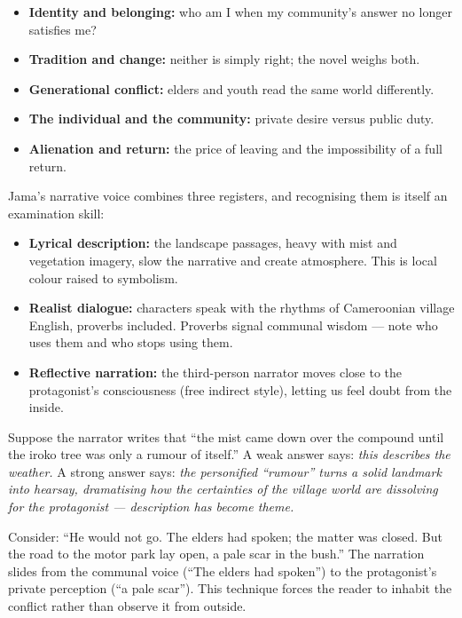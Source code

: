 \documentclass[11pt]{article}
\newcommand{\cle}[1]{{\popxbold\color{popdark}#1}}
\newcounter{popsec}
\newcounter{popsub}
\newcommand{\courssub}[1]{%
  \stepcounter{popsub}%
  \par\vspace{9pt}\noindent{\popxbold\fontsize{11.5}{13}\selectfont\color{popink}{\color{poporange}\thepopsec.\thepopsub}\hspace{6pt}#1}\par\nopagebreak\vspace{4pt}
}
\begin{document}
\begin{aretenir}
\begin{itemize}
\item \textbf{Identity and belonging:} who am I when my community's answer no longer satisfies me?
\item \textbf{Tradition and change:} neither is simply right; the novel weighs both.
\item \textbf{Generational conflict:} elders and youth read the same world differently.
\item \textbf{The individual and the community:} private desire versus public duty.
\item \textbf{Alienation and return:} the price of leaving and the impossibility of a full return.
\end{itemize}
\end{aretenir}

\courssub{The Writer's Style and Language}

Jama's narrative voice combines three registers, and recognising them is itself an examination skill:

\begin{itemize}
\item \textbf{Lyrical description:} the landscape passages, heavy with mist and vegetation imagery, slow the narrative and create atmosphere. This is \cle{local colour} raised to symbolism.
\item \textbf{Realist dialogue:} characters speak with the rhythms of Cameroonian village English, proverbs included. Proverbs signal communal wisdom — note who uses them and who stops using them.
\item \textbf{Reflective narration:} the third-person narrator moves close to the protagonist's consciousness (free indirect style), letting us feel doubt from the inside.
\end{itemize}

\begin{exemplebox}
Suppose the narrator writes that ``the mist came down over the compound until the iroko tree was only a rumour of itself.'' A weak answer says: \emph{this describes the weather.} A strong answer says: \emph{the personified ``rumour'' turns a solid landmark into hearsay, dramatising how the certainties of the village world are dissolving for the protagonist — description has become theme.}
\end{exemplebox}

\begin{exemplebox}
Consider: ``He would not go. The elders had spoken; the matter was closed. But the road to the motor park lay open, a pale scar in the bush.'' The narration slides from the communal voice (``The elders had spoken'') to the protagonist's private perception (``a pale scar''). This technique forces the reader to inhabit the conflict rather than observe it from outside.
\end{exemplebox}
\end{document}
